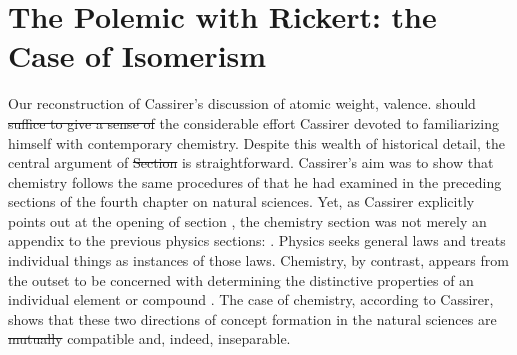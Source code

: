 \documentclass[submitted,12pt]{article}
\providecommand{\DIFadd}[1]{{\protect\color{blue}\uwave{#1}}} %
\providecommand{\DIFdel}[1]{{\protect\color{red}\sout{#1}}}                      %
\providecommand{\DIFaddbegin}{} %
\providecommand{\DIFaddend}{} %
\providecommand{\DIFdelbegin}{} %
\providecommand{\DIFdelend}{} %
\begin{document}
\section{The Polemic with Rickert: the Case of Isomerism}
\label{sec:rickert}



Our reconstruction of Cassirer's discussion of atomic weight, valence\etc. should \DIFdelbegin \DIFdel{suffice to give a sense of }\DIFdelend \DIFaddbegin \DIFadd{convey }\DIFaddend the considerable effort Cassirer devoted to familiarizing himself with contemporary chemistry. Despite this wealth of historical detail, the central argument of \DIFdelbegin \DIFdel{Section }\DIFdelend \DIFaddbegin \DIFadd{section }\DIFaddend {} is straightforward. Cassirer's aim was to show that chemistry follows the same procedures of   that he had examined in the preceding sections of the fourth chapter on \DIFaddbegin \DIFadd{the }\DIFaddend natural sciences. Yet, as Cassirer explicitly points out at the opening of section , the chemistry section was not merely an appendix to the previous physics sections:  . Physics seeks general laws and treats individual things as instances of those laws. Chemistry, by contrast, appears from the outset to be concerned with determining the distinctive properties of an individual element or compound  . The case of chemistry, according to Cassirer, shows that these two directions of concept formation in the natural sciences are \DIFdelbegin \DIFdel{mutually }\DIFdelend compatible and, indeed, inseparable. 


\end{document}
